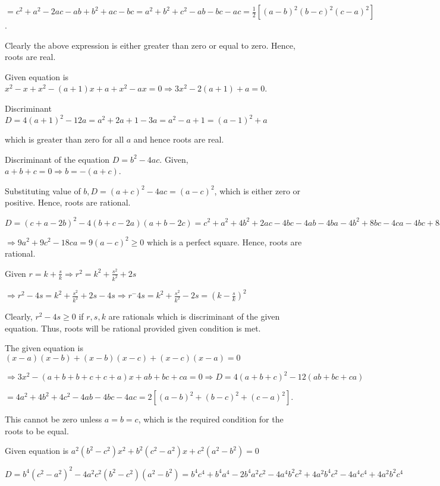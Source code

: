   $= c^2 + a^2 -2ac - ab + b^2 + ac - bc = a^2 + b^2 + c^2 - ab - bc - ac = \frac{1}{2}[(a - b)^2(b - c)^2(c
  - a)^2]$.

  Clearly the above expression is either greater than zero or equal to zero. Hence, roots are real.
\item Given equation is $x^2 - x + x^2 - (a + 1)x + a + x^2 - ax = 0\Rightarrow 3x^2 - 2(a + 1) + a = 0$.

  Discriminant $D = 4(a + 1)^2 - 12a = a^2 + 2a + 1 - 3a = a^2 - a + 1 = (a - 1)^2 + a$

  which is greater than zero for all $a$ and hence roots are real.
\item Discriminant of the equation $D = b^2 - 4ac$. Given, $a + b + c = 0 \Rightarrow b = -(a + c)$.

  Substituting value of $b, D = (a + c)^2 - 4ac = (a - c)^2$, which is either zero or positive. Hence, roots
  are rational.
\item $D = (c + a - 2b)^2 - 4(b + c - 2a)(a + b - 2c) = c^2 + a^2 + 4b^2 + 2ac - 4bc - 4ab -4ba -4b^2 + 8bc
  - 4ca - 4bc + 8c^2 + 8a^2 + 8ab - 8ca$

  $\Rightarrow 9a^2 + 9c^2 - 18ca = 9(a - c)^2 \geq 0$ which is a perfect square. Hence, roots are rational.
\item Given $r = k + \frac{s}{k} \Rightarrow r^2 = k^2 + \frac{s^2}{k^2} + 2s$

  $\Rightarrow r^2 - 4s = k^2 + \frac{s^2}{k^2} + 2s - 4s\Rightarrow r^ - 4s = k^2 + \frac{s^2}{k^2} - 2s
  = \left(k - \frac{s}{k}\right)^2$

  Clearly, $r^2 - 4s \geq 0$ if $r, s, k$ are rationals which is discriminant of the given equation. Thus, roots will
  be rational provided given condition is met.
\item The given equation is $(x - a)(x - b) + (x - b)(x - c) + (x - c)(x - a) = 0$

  $\Rightarrow 3x^2 -(a + b + b + c + c + a)x + ab + bc + ca = 0\Rightarrow D = 4(a + b + c)^2 - 12(ab + bc + ca)$

  $= 4a^2 + 4b^2 + 4c^2 - 4ab - 4bc - 4ac = 2[(a - b)^2 + (b - c)^2 + (c - a)^2]$.

  This cannot be zero unless $a = b = c$, which is the required condition for the roots to be equal.
\item Given equation is $a^2(b^2 - c^2)x^2 + b^2(c^2 - a^2)x + c^2(a^2 - b^2) = 0$

  $D = b^4(c^2 - a^2)^2 - 4a^2c^2(b^2 - c^2)(a^2 - b^2) = b^4c^4 + b^4a^4 - 2b^4a^2c^2 - 4a^4b^2c^2 +
  4a^2b^4c^2 - 4a^4c^4 + 4a^2b^2c^4$

